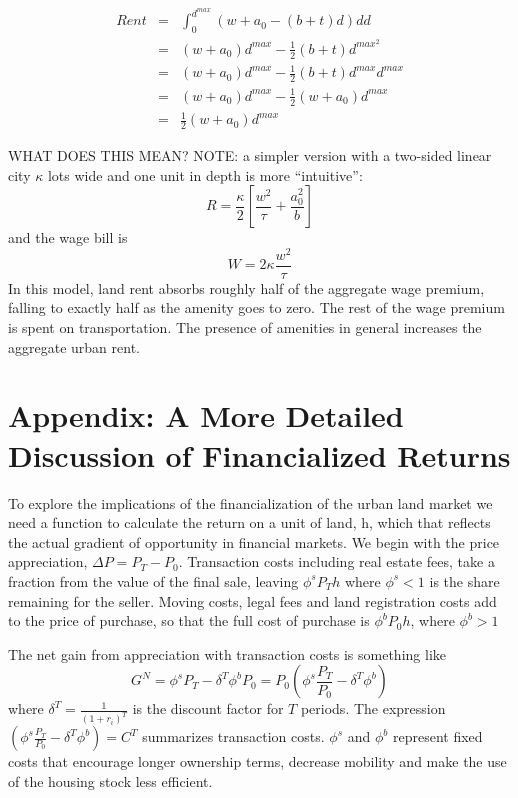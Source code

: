 \begin{eqnarray}Rent	&=&  \int_0^{d^{max}}( w+a_0 - (b+t)d) dd\\  %
					&=&  (w+a_0)d^{max} - \frac{1}{2}(b+t)d^{max^2} \\
					&= &  (w+a_0)d^{max} - \frac{1}{2}(b+t)d^{max}d^{max}\\
					&=&   (w+a_0)d^{max} - \frac{1}{2}(w+a_0)d^{max}\\
					&= &  \frac{1}{2}(w+a_0)d^{max}
\end{eqnarray}

WHAT DOES THIS MEAN?
NOTE: a simpler version  with a two-sided linear city $\kappa$ lots wide and  one unit in depth is more ``intuitive'':
\[R	= \frac{\kappa}{2} \left[\frac{w^2}{\tau} +  \frac{a_0^2}{b}\right] \]
and the wage bill is 
\[W	=2 \kappa \frac{w^2}{\tau} \]
In this model, land rent absorbs roughly half of the aggregate wage premium,  falling to exactly half as the amenity goes to zero. 
The rest of the wage premium is spent on transportation. 
The presence of amenities in general increases the aggregate urban rent.

\chapter*{Appendix: A More Detailed Discussion of Financialized Returns}

To explore the implications  of the financialization of  the urban land market we need a function to calculate the return on a unit of land, h, which that reflects the actual gradient of opportunity in financial markets. We begin with the price appreciation, $\Delta P=P_T-P_0$. Transaction costs including real estate fees, take a fraction from the value of the final sale, leaving $\phi^sP_Th$ where $\phi^s<1$ is the share remaining for the seller. Moving costs, legal fees and land registration costs add to the price of purchase, so that the full cost of purchase is $\phi^bP_0h$, where $\phi^b>1$

%

The net gain from appreciation with transaction costs is something like \[G^N=\phi^s P_T-\delta^T\phi^b P_0=P_0(\phi^s \frac{P_T}{P_0}-\delta^T\phi^b)\]%
where $\delta^T=\frac{1}{(1+r_i)^T}$ is the discount factor for $T$ periods. The expression $(\phi^s \frac{P_T}{P_0}-\delta^T\phi^b)=C^T$ summarizes transaction costs. $\phi^s$ and $\phi^b$ represent  fixed costs that  encourage longer ownership terms, decrease mobility and make the use of the housing stock less efficient. 

